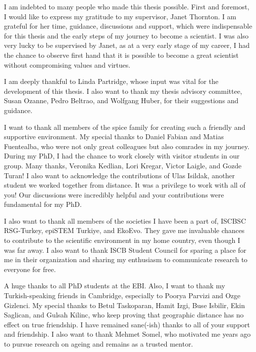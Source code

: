 \documentclass[12pt,twoside]{unicam}
\begin{document}
  \begin{acknowledgements}
    I am indebted to many people who made this thesis possible. First and foremost, I would like to express my gratitude to my supervisor, Janet Thornton. I am grateful for her time, guidance, discussions and support, which were indispensable for this thesis and the early steps of my journey to become a scientist. I was also very lucky to be supervised by Janet, as at a very early stage of my career, I had the chance to observe first hand that it is possible to become a great scientist without compromising values and virtues.

    \vspace{0.3cm}

    I am deeply thankful to Linda Partridge, whose input was vital for the development of this thesis. I also want to thank my thesis advisory committee, Susan Ozanne, Pedro Beltrao, and Wolfgang Huber, for their suggestions and guidance.

    \vspace{0.3cm}

    I want to thank all members of the spice family for creating such a friendly and supportive environment. My special thanks to Daniel Fabian and Matias Fuentealba, who were not only great colleagues but also comrades in my journey. During my PhD, I had the chance to work closely with visitor students in our group. Many thanks, Veronika Kedlian, Lori Kregar, Victor Laigle, and Gozde Turan! I also want to acknowledge the contributions of Ulas Isildak, another student we worked together from distance. It was a privilege to work with all of you! Our discussions were incredibly helpful and your contributions were fundamental for my PhD.

    \vspace{0.3cm}

    I also want to thank all members of the societies I have been a part of, ISCBSC RSG-Turkey, epiSTEM Turkiye, and EkoEvo. They gave me invaluable chances to contribute to the scientific environment in my home country, even though I was far away. I also want to thank ISCB Student Council for sparing a place for me in their organization and sharing my enthusiasm to communicate research to everyone for free.

    \vspace{0.3cm}

    A huge thanks to all PhD students at the EBI. Also, I want to thank my Turkish-speaking friends in Cambridge, especially to Poorya Parvizi and Ozge Gizlenci. My special thanks to Betul Taskoparan, Hamit Izgi, Buse Isbilir, Ekin Saglican, and Gulsah Kilinc, who keep proving that geographic distance has no effect on true friendship. I have remained sane(-ish) thanks to all of your support and friendship. I also want to thank Mehmet Somel, who motivated me years ago to pursue research on ageing and remains as a trusted mentor.


\end{acknowledgements}
\end{document}
